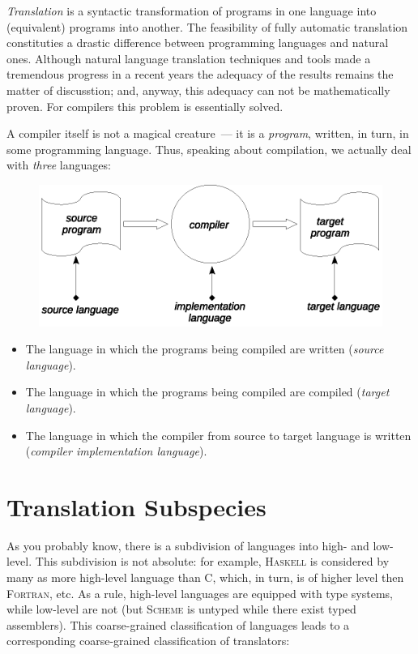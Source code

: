 \documentclass{book}
\newcommand{\lang}[1]{\textsc{#1}}
\begin{document}
\emph{Translation} is a syntactic transformation of programs in one language into (equivalent) programs into another.
The feasibility of fully automatic translation constituties a drastic difference between programming languages and natural ones.
Although natural language translation techniques and tools made a tremendous progress in a recent years the adequacy of the results
remains the matter of discusstion; and, anyway, this adequacy can not be mathematically proven. For compilers this problem
is essentially solved.

A compiler itself is not a magical creature~--- it is a \emph{program}, written, in turn, in some programming language. Thus, speaking
about compilation, we actually deal with \emph{three} languages:

\begin{figure}[h]
  \centering
  \includegraphics[scale=0.7]{images/01-04.eps}
\end{figure}

\begin{itemize}
\item The language in which the programs being compiled are written (\emph{source language}).
\item The language in which the programs being compiled are compiled (\emph{target language}).
\item The language in which the compiler from source to target language is written (\emph{compiler implementation language}).
\end{itemize}

\section{Translation Subspecies}

As you probably know, there is a subdivision of languages into high- and low-level. This subdivision is not absolute: for example,
\lang{Haskell} is considered by many as more high-level language than \lang{C}, which, in turn, is of higher level then \lang{Fortran}, etc.
As a rule, high-level languages are equipped with type systems, while low-level are not (but \lang{Scheme} is untyped while there 
exist typed assemblers). This coarse-grained classification of languages leads to a corresponding coarse-grained classification of
translators:
\end{document}
